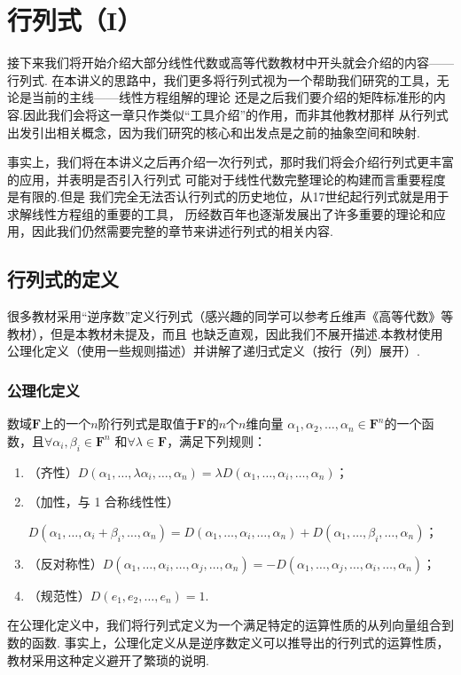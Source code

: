 \chapter{行列式（I）}

接下来我们将开始介绍大部分线性代数或高等代数教材中开头就会介绍的内容——行列式.
在本讲义的思路中，我们更多将行列式视为一个帮助我们研究的工具，无论是当前的主线——线性方程组解的理论
还是之后我们要介绍的矩阵标准形的内容.因此我们会将这一章只作类似``工具介绍''的作用，而非其他教材那样
从行列式出发引出相关概念，因为我们研究的核心和出发点是之前的抽象空间和映射.

事实上，我们将在本讲义之后再介绍一次行列式，那时我们将会介绍行列式更丰富的应用，并表明是否引入行列式
可能对于线性代数完整理论的构建而言重要程度是有限的.但是
我们完全无法否认行列式的历史地位，从17世纪起行列式就是用于求解线性方程组的重要的工具，
历经数百年也逐渐发展出了许多重要的理论和应用，因此我们仍然需要完整的章节来讲述行列式的相关内容.

\section{行列式的定义}
很多教材采用``逆序数''定义行列式（感兴趣的同学可以参考丘维声《高等代数》等教材），但是本教材未提及，而且
也缺乏直观，因此我们不展开描述.本教材使用公理化定义（使用一些规则描述）并讲解了递归式定义（按行（列）展开）.

\subsection{公理化定义}
\begin{definition} \label{def:11:公理化定义}
    数域$\mathbf{F}$上的一个$n$阶行列式是取值于$\mathbf{F}$的$n$个$n$维向量
    $\alpha_1,\alpha_2,\ldots,\alpha_n \in \mathbf{F}^n$的一个函数，且$\forall \alpha_i,\beta_i \in \mathbf{F}^n$
    和$\forall \lambda \in \mathbf{F}$，满足下列规则：
    \begin{enumerate}
        \item（齐性）$D(\alpha_1,\ldots,\lambda\alpha_i,\ldots,\alpha_n)=\lambda D(\alpha_1,\ldots,\alpha_i,\ldots,\alpha_n)$；

        \item（加性，与 1 合称线性性）

        $D(\alpha_1,\ldots,\alpha_i+\beta_i,\ldots,\alpha_n)=D(\alpha_1,\ldots,\alpha_i,\ldots,\alpha_n)+D(\alpha_1,\ldots,\beta_i,\ldots,\alpha_n)$；

        \item（反对称性）$D(\alpha_1,\ldots,\alpha_i,\ldots,\alpha_j,\ldots,\alpha_n)=-D(\alpha_1,\ldots,\alpha_j,\ldots,\alpha_i,\ldots,\alpha_n)$；

        \item（规范性）$D(e_1,e_2,\ldots,e_n)=1$.
    \end{enumerate}
\end{definition}
在公理化定义中，我们将行列式定义为一个满足特定的运算性质的从列向量组合到数的函数.
事实上，公理化定义从是逆序数定义可以推导出的行列式的运算性质，教材采用这种定义避开了繁琐的说明.


